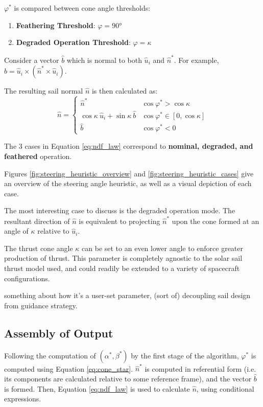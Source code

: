 $\varphi^*$ is compared between cone angle thresholds:
\begin{enumerate}
  \item \textbf{Feathering Threshold}: $\varphi = \ang{90}$
  \item \textbf{Degraded Operation Threshold}: $\varphi = \kappa$
\end{enumerate}

Consider a vector $\hat{b}$ which is normal to both $\hat{u}_i$ and $\hat{n}^*$. For example, $\hat{b} = \hat{u}_i \times (\hat{n}^* \times \hat{u}_i)$.

The resulting sail normal $\hat{n}$ is then calculated as:
\begin{equation}
  \hat{n} = \begin{cases}
    \hat{n}^*                                       & \cos \varphi^* > \cos \kappa          \\
    \cos \kappa \ \hat{u}_i + \sin \kappa \ \hat{b} & \cos \varphi^* \in  [ 0, \cos \kappa] \\
    \hat{b}                                         & \cos \varphi^* < 0
  \end{cases}
  \label{eq:ndf_law}
\end{equation}

The 3 cases in Equation \ref{eq:ndf_law} correspond to \textbf{nominal, degraded, and feathered} operation.




Figures \ref{fig:steering_heuristic_overview} and \ref{fig:steering_heuristic_cases} give an overview of the steering angle heuristic, as well as a visual depiction of each case.

The most interesting case to discuss is the degraded operation mode. The resultant direction of $\hat{n}$ is equivalent to projecting $\hat{n}^*$ upon the cone formed at an angle of $\kappa$ relative to $\hat{u}_i$.

The thrust cone angle $\kappa$ can be set to an even lower angle to enforce greater production of thrust. This parameter is completely agnostic to the solar sail thrust model used, and could readily be extended to a variety of spacecraft configurations.

something about how it's a user-set parameter, (sort of) decoupling sail design from guidance strategy.

\subsection{Assembly of Output}
Following the computation of $(\alpha^*, \beta^*)$ by the first stage of the algorithm, $\varphi^*$ is computed using Equation \ref{eq:cone_star}. $\hat{n}^*$ is computed in referential form (i.e. its components are calculated relative to some reference frame), and the vector $\hat{b}$ is formed. Then, Equation \ref{eq:ndf_law} is used to calculate $\hat{n}$, using conditional expressions.

